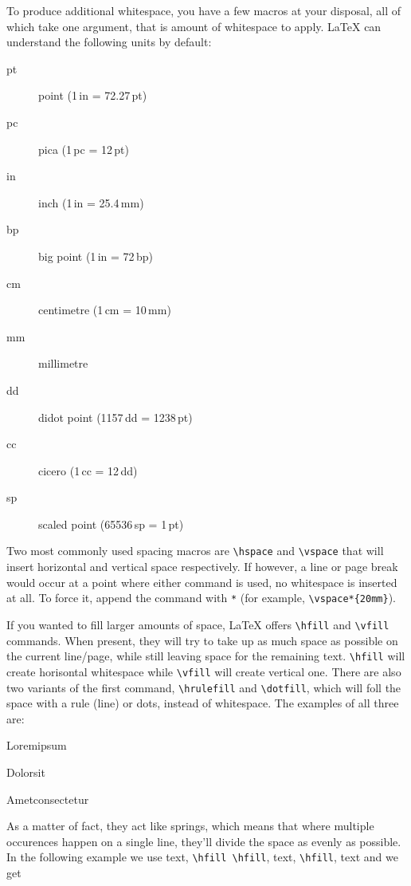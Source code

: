 To produce additional whitespace, you have a few macros at your disposal, all of which take one argument, that is amount of whitespace to apply. LaTeX can understand the following units by default:

\begin{description}
  \item[pt]  point         (1\,in = 72.27\,pt)
  \item[pc]  pica          (1\,pc = 12\,pt)
  \item[in]  inch          (1\,in = 25.4\,mm)
  \item[bp]  big point     (1\,in = 72\,bp)
  \item[cm]  centimetre    (1\,cm = 10\,mm)
  \item[mm]  millimetre
  \item[dd]  didot point   (1157\,dd = 1238\,pt)
  \item[cc]  cicero        (1\,cc = 12\,dd)
  \item[sp]  scaled point  (65536\,sp = 1\,pt)
\end{description}

Two most commonly used spacing macros are \verb|\hspace| and \verb|\vspace| that will insert horizontal and vertical space respectively. If however, a line or page break would occur at a point where either command is used, no whitespace is inserted at all. To force it, append the command with \verb|*| (for example, \verb|\vspace*{20mm}|).

If you wanted to fill larger amounts of space, LaTeX offers \verb|\hfill| and \verb|\vfill| commands. When present, they will try to take up as much space as possible on the current line/page, while still leaving space for the remaining text. \verb|\hfill| will create horisontal whitespace while \verb|\vfill| will create vertical one. There are also two variants of the first command, \verb|\hrulefill| and \verb|\dotfill|, which will foll the space with a rule (line) or dots, instead of whitespace. The examples of all three are:

Lorem\hfill ipsum

Dolor\hrulefill sit

Amet\dotfill consectetur

As a matter of fact, they act like springs, which means that where multiple occurences happen on a single line, they'll divide the space as evenly as possible. In the following example we use text, \verb|\hfill \hfill|, text, \verb|\hfill|, text and we get

